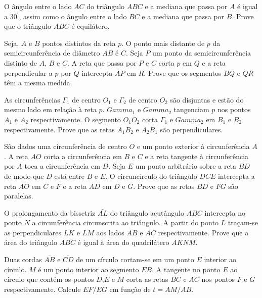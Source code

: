 
\begin{questao}

  O ângulo entre o lado $AC$ do triângulo $ABC$ e a
  mediana que passa por $A$ é igual a $30^\prime$,  assim como o
  ângulo entre o lado $BC$ e a mediana que passa por $B$. Prove
  que o triângulo $ABC$ é equilátero.
\end{questao}

\begin{questao}
  Seja, $A$ e $B$ pontos distintos da reta $p$. O
  ponto mais distante de $p$ da semicircunferência de diâmetro
  $AB$ é $C$. Seja $P$ um ponto da semicircunferência distinto
  de $A$, $B$ e $C$. A reta que passa por $P$ e $C$ corta
  $p$ em $Q$ e a reta perpendicular a $p$ por $Q$ intercepta
  $AP$ em $R$. Prove que os segmentos $BQ$ e $QR$ têm a mesma
  medida.
\end{questao}

\begin{questao}
  As circunferências $\Gamma_1$ de centro $O_1$ e
  $\Gamma_2$ de centro $O_2$ são disjuntas e estão do mesmo lado
  em relação à reta $p$. $Gamma_1$ e  $Gamma_2$ tangenciam $p$
  nos pontos $A_1$ e $A_2$ respectivamente. O segmento $O_1O_2$
  corta $\Gamma_1$ e $Gamma_2$ em $B_1$ e $B_2$
  respectivamente. Prove que as retas $A_1B_2$ e $A_2B_1$ são
  perpendiculares.
\end{questao}

\begin{questao}
  São dados uma circunferência de centro $O$ e um ponto
  exterior à circunferência $A$. A reta $AO$ corta a
  circunferência em $B$ e $C$ e a reta tangente à circunferência
  por $A$ toca a circunferência em $D$. Seja $E$ um ponto
  arbitrário sobre a reta $BD$ de modo que $D$ está entre $B$ e
  $E$. O circuncírculo do triângulo $DCE$ intercepta a reta $AO$
  em $C$ e $F$ e a reta $AD$ em $D$ e $G$. Prove que as
  retas $BD$ e $FG$ são paralelas.
\end{questao}

\begin{questao}
  O prolongamento da bissetriz $\bar{AL}$ do triângulo
  acutângulo $ABC$ intercepta no ponto $N$ a circunferência
  circunscrita ao triângulo. A partir do ponto $L$ traçam-se as
  perpendiculares $\bar{LK}$ e $\bar{LM}$ aos lados
  $\bar{AB}$ e $\bar{AC}$ respectivamente. Prove que a
  área do triângulo $ABC$ é igual à área do quadrilátero $AKNM$.
\end{questao}

\begin{questao}
  Duas cordas $\bar{AB}$ e $\bar{CD}$ de um
  círculo cortam-se em um ponto $E$ interior ao círculo. $M$ é um
  ponto interior ao segmento $\bar{EB}$. A tangente no ponto
  $E$ ao círculo que contém os pontos $D$,$E$ e $M$ corta as
  retas $BC$ e $AC$ nos pontos $F$ e $G$
  respectivamente. Calcule $EF/EG$ em função de $t = AM/AB$.
\end{questao}

